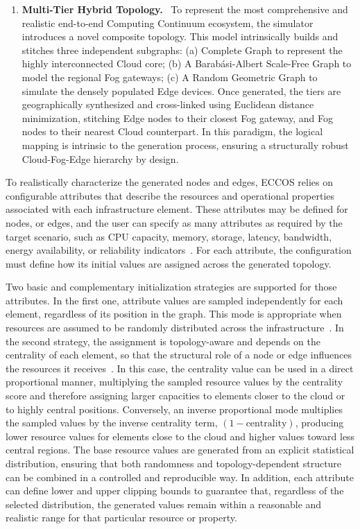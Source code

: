 \documentclass[ASNA]{USG} %
\begin{document}
\begin{enumerate}
\item \textbf{Multi-Tier Hybrid Topology.}~\cite{Armeniakos2025Stochastic,Fernando2025On}  To represent the most comprehensive and realistic end-to-end Computing Continuum ecosystem, the simulator introduces a novel composite topology. This model intrinsically builds and stitches three independent subgraphs: (a) Complete Graph to represent the highly interconnected Cloud core; (b) A Barabási-Albert Scale-Free Graph to model the regional Fog gateways; (c) A Random Geometric Graph to simulate the densely populated Edge devices. Once generated, the tiers are geographically synthesized and cross-linked using Euclidean distance minimization, stitching Edge nodes to their closest Fog gateway, and Fog nodes to their nearest Cloud counterpart. In this paradigm, the logical mapping is intrinsic to the generation process, ensuring a structurally robust Cloud-Fog-Edge hierarchy by design.

\end{enumerate}


To realistically characterize the generated nodes and edges, \textsc{ECCOS} relies on configurable attributes that describe the resources and operational properties associated with each infrastructure element. These attributes may be defined for nodes, or edges, and the user can specify as many attributes as required by the target scenario, such as CPU capacity, memory, storage, latency, bandwidth, energy availability, or reliability indicators~\cite{Sefati2025A}. For each attribute, the configuration must define how its initial values are assigned across the generated topology.

Two basic and complementary initialization strategies are supported for those attributes. In the first one, attribute values are sampled independently for each element, regardless of its position in the graph. This mode is appropriate when resources are assumed to be randomly distributed across the infrastructure~\cite{Wang2024Dynamic}. In the second strategy, the assignment is topology-aware and depends on the centrality of each element, so that the structural role of a node or edge influences the resources it receives~\cite{Oldham2018Consistency}. In this case, the centrality value can be used in a direct proportional manner, multiplying the sampled resource values by the centrality score and therefore assigning larger capacities to elements closer to the cloud or to highly central positions. Conversely, an inverse proportional mode multiplies the sampled values by the inverse centrality term, $(1 - \text{centrality})$, producing lower resource values for elements close to the cloud and higher values toward less central regions. The base resource values are generated from an explicit statistical distribution, ensuring that both randomness and topology-dependent structure can be combined in a controlled and reproducible way. In addition, each attribute can define lower and upper clipping bounds to guarantee that, regardless of the selected distribution, the generated values remain within a reasonable and realistic range for that particular resource or property. 
\end{document}
